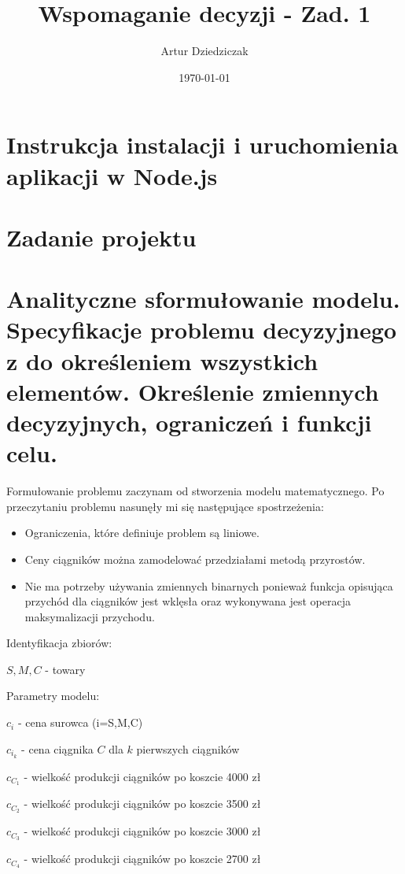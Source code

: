\documentclass{article}
\title{Wspomaganie decyzji - Zad. 1}
\author{Artur Dziedziczak}
\date{\today}
\begin{document}
\maketitle

\section{Instrukcja instalacji i uruchomienia aplikacji w Node.js}



\section{Zadanie projektu}

\section{Analityczne sformułowanie modelu. Specyfikacje problemu decyzyjnego z do określeniem wszystkich elementów. Określenie zmiennych decyzyjnych, ograniczeń i funkcji celu.}

Formułowanie problemu zaczynam od stworzenia modelu matematycznego.
Po przeczytaniu problemu nasunęły mi się następujące spostrzeżenia:

\begin{itemize}
	\item Ograniczenia, które definiuje problem są liniowe.
	\item Ceny ciągników można zamodelować przedziałami metodą przyrostów.
	\item Nie ma potrzeby używania zmiennych binarnych ponieważ funkcja opisująca przychód dla ciągników jest wklęsła oraz wykonywana jest operacja maksymalizacji przychodu.
\end{itemize}


Identyfikacja zbiorów: 

${ S, M ,C }$ - towary

Parametry modelu:

$c_i$ - cena surowca (i=S,M,C)

$c_i_k$ - cena ciągnika $C$ dla $k$ pierwszych ciągników

$c_C_1$ - wielkość produkcji ciągników po koszcie 4000 zł

$c_C_2$ - wielkość produkcji ciągników po koszcie 3500 zł

$c_C_3$ - wielkość produkcji ciągników po koszcie 3000 zł

$c_C_4$ - wielkość produkcji ciągników po koszcie 2700 zł
\end{document}
